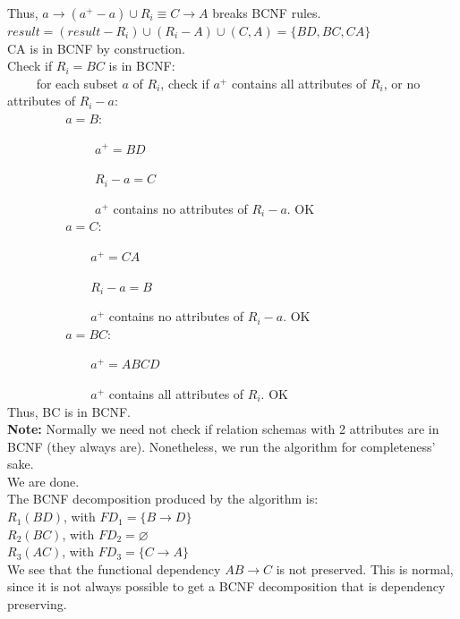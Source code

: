 \documentclass[a4paper]{article}
\begin{document}
Thus, $a \rightarrow (a^+ - a) \cup R_i \equiv C \rightarrow A $ breaks BCNF rules. \\
		
$ result = (result - R_i) \cup (R_i - A) \cup (C, A) = \{ BD, BC, CA\} $ \\

CA is in BCNF by construction. \\

Check if $ R_i = BC $ is in BCNF: \\

~~~~ for each subset $a$ of $R_i$, check if $a^+$ contains all attributes of $ R_i $, or no attributes of $ R_i - a $: \\
	
~~~~ ~~~~ $a = B:$ 
	
~~~~ ~~~~ ~~~~	$a^+ = BD$ 
	
~~~~ ~~~~	 ~~~~ $ R_i - a = C $ 
	
~~~~ ~~~~ ~~~~	$ a^+ $ contains no attributes of $ R_i - a$. OK \\
	
~~~~ ~~~~	$ a = C: $
	
~~~~ ~~~~	 ~~~~$ a^+ = CA $ 
	
~~~~ ~~~~ ~~~~$ R_i - a = B $
	
~~~~ ~~~~	 ~~~~$ a^+ $ contains no attributes of $R_i - a.$ OK \\

~~~~ ~~~~	 $ a = BC: $
	
~~~~ ~~~~	 ~~~~$ a^+ = ABCD $
	
~~~~ ~~~~	 ~~~~$ a^+ $ contains all attributes of $ R_i $. OK \\

Thus, BC is in BCNF. \\

\textbf{Note:} Normally we need not check if relation schemas with 2 attributes are in BCNF (they always are). Nonetheless, we run the algorithm for completeness' sake.  \\
	
We are done. \\

The BCNF decomposition produced by the algorithm is: \\

$ R_1(BD) $, with $FD_1 = \{ B \rightarrow D \}$ \\
$ R_2(BC) $, with $FD_2 = \varnothing $ \\
$ R_3(AC) $, with $FD_3 = \{ C \rightarrow A \}$ \\

We see that the functional dependency $ AB \rightarrow C $ is not preserved. This is normal, since it is not always possible to get a BCNF decomposition that is dependency preserving.
\end{document}
